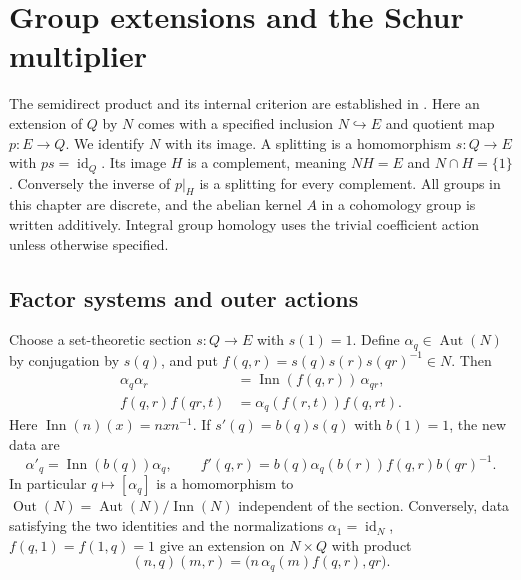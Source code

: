 \chapter{Group extensions and the Schur multiplier}
\label{ch:gr02-extensions}

The semidirect product and its internal criterion are established
in \cite[K07.04.semidirect\_product and K07.04.semidirect\_recognition]{d07}.
Here an extension of \(Q\) by \(N\) comes with a specified
inclusion \(N\hookrightarrow E\) and quotient map \(p:E\to Q\).
We identify \(N\) with its image. A splitting is a homomorphism
\(s:Q\to E\) with \(ps=\operatorname{id}_Q\). Its image \(H\) is a
complement, meaning \(NH=E\) and \(N\cap H=\{1\}\). Conversely the
inverse of \(p|_H\) is a splitting for every complement. All groups
in this chapter are discrete, and the abelian kernel \(A\) in a
cohomology group is written additively. Integral group homology
uses the trivial coefficient action unless otherwise specified.

\section{Factor systems and outer actions}

\begin{proposition}
\label{prop:gr02-factor-system}
Choose a set-theoretic section \(s:Q\to E\) with \(s(1)=1\).
Define \(\alpha_q\in\operatorname{Aut}(N)\) by conjugation by \(s(q)\),
and put \(f(q,r)=s(q)s(r)s(qr)^{-1}\in N\). Then
\begin{align*}
 \alpha_q\alpha_r &=\operatorname{Inn}(f(q,r))\,\alpha_{qr},\\
 f(q,r)f(qr,t)&=\alpha_q(f(r,t))f(q,rt).
\end{align*}
Here \(\operatorname{Inn}(n)(x)=nxn^{-1}\). If \(s'(q)=b(q)s(q)\)
with \(b(1)=1\), the new data are
\[
 \alpha'_q=\operatorname{Inn}(b(q))\alpha_q,\qquad
 f'(q,r)=b(q)\alpha_q(b(r))f(q,r)b(qr)^{-1}.
\]
In particular \(q\mapsto[\alpha_q]\) is a homomorphism
to \(\operatorname{Out}(N)=\operatorname{Aut}(N)/\operatorname{Inn}(N)\)
independent of the section. Conversely, data satisfying the two
identities and the normalizations
\(\alpha_1=\operatorname{id}_N\), \(f(q,1)=f(1,q)=1\)
give an extension on \(N\times Q\) with product
\[
 (n,q)(m,r)=\bigl(n\,\alpha_q(m)f(q,r),qr\bigr).
\]
\end{proposition}

